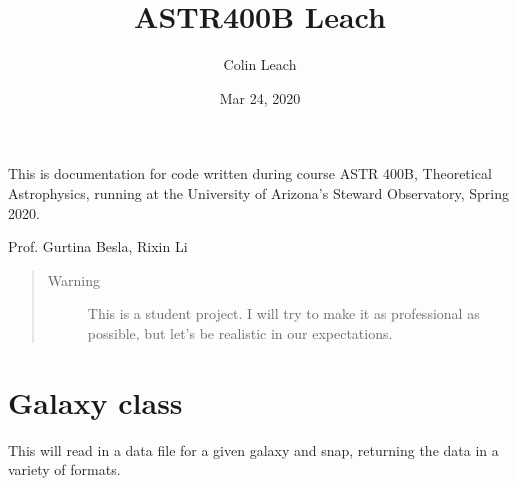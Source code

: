 \documentclass[letterpaper,10pt,english]{sphinxmanual}
\title{ASTR400B Leach}
\date{Mar 24, 2020}
\author{Colin Leach}
\begin{document}
\pagestyle{empty}
\sphinxmaketitle
\pagestyle{plain}
\sphinxtableofcontents
\pagestyle{normal}
\label{\detokenize{index::doc}}


This is documentation for code written during course ASTR 400B,
Theoretical Astrophysics, running at the University of Arizona’s
Steward Observatory, Spring 2020.

 Prof. Gurtina Besla,   Rixin Li

 
\begin{quote}\begin{description}
\item[{Warning}] \leavevmode
This is a student project. I will try to make it as professional as
possible, but let’s be realistic in our expectations.

\end{description}\end{quote}
\label{\detokenize{galaxy:module-galaxy.galaxy}}

\chapter{Galaxy class}
\label{\detokenize{galaxy:galaxy-class}}\label{\detokenize{galaxy::doc}}
This will read in a data file for a given galaxy and snap, returning the
data in a variety of formats.
\end{document}
